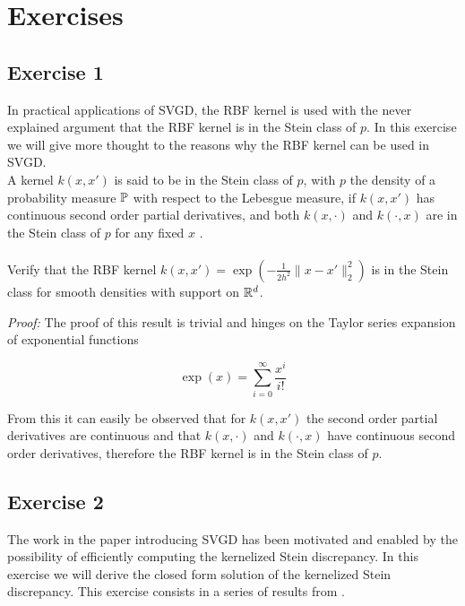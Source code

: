 

\section{Exercises}

\subsection{Exercise 1}
In practical applications of SVGD, the RBF kernel is used with the never explained argument that the RBF kernel is in the Stein class of $p$. In this exercise we will give more thought to the reasons why the RBF kernel can be used in SVGD.
\\
\noindent A kernel $k(x, x')$ is said to be in the Stein class of $p$, with $p$ the density of a probability measure $\mathbb{P}$ with respect to the Lebesgue measure, if $k(x, x')$ has continuous second order partial derivatives, and both $k(x, \cdot)$ and $k(\cdot, x)$ are in the Stein class of $p$ for any fixed $x$ \cite{liu2016kernelized}. 
\\
\\
\noindent Verify that the RBF kernel $k(x, x') = \exp \left(-\frac{1}{2h^2}\parallel x - x'\parallel^2_2 \right)$ is in the Stein class for smooth densities with support on $\mathbb{R}^d$.

\noindent \emph{Proof:} The proof of this result is trivial and hinges on the Taylor series expansion of exponential functions

\begin{equation*}
\exp(x) = \sum_{i=0}^{\infty} \frac{x^i}{i!}
\end{equation*}

From this it can easily be observed that for $k(x, x')$ the second order partial derivatives are continuous and that $k(x, \cdot)$ and $k(\cdot, x)$ have continuous second order derivatives, therefore the RBF kernel is in the Stein class of $p$.

\subsection{Exercise 2}
The work in the paper introducing SVGD has been motivated and enabled by the possibility of efficiently computing the kernelized Stein discrepancy. In this exercise we will derive the closed form solution of the kernelized Stein discrepancy. This exercise consists in a series of results from \cite{liu2016kernelized}.

